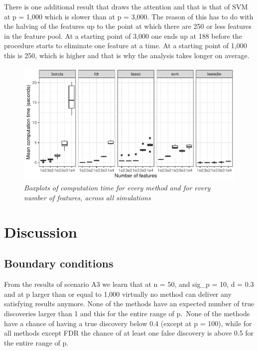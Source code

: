 \documentclass[
]{article}
\begin{document}
There is one additional result that draws the attention and that is that of SVM at p = 1,000 which is slower than at p = 3,000. The reason of this has to do with the halving of the features up to the point at which there are 250 or less features in the feature pool. At a starting point of 3,000 one ends up at 188 before the procedure starts to eliminate one feature at a time. At a starting point of 1,000 this is 250, which is higher and that is why the analysis takes longer on average.

\begin{figure}

{\centering \includegraphics[width=1\linewidth]{main_files/figure-latex/timeresults-1} 

}

\caption{\textit{Boxplots of computation time for every method and for every number of features, across all simulations}}\label{fig:timeresults}
\end{figure}

\newpage

\hypertarget{discussion}{%
\section{Discussion}\label{discussion}}

\hypertarget{boundary-conditions}{%
\subsection{Boundary conditions}\label{boundary-conditions}}

From the results of scenario A3 we learn that at n = 50, and sig\_p = 10, d = 0.3 and at p larger than or equal to 1,000 virtually no method can deliver any satisfying results anymore. None of the methods have an expected number of true discoveries larger than 1 and this for the entire range of p.~None of the methods have a chance of having a true discovery below 0.4 (except at p = 100), while for all methods except FDR the chance of at least one false discovery is above 0.5 for the entire range of p.
\end{document}

